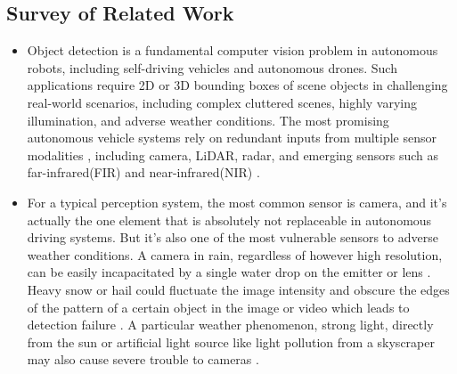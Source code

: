 \documentclass[rnd]{mas_proposal}
\begin{document}
\subsection{Survey of Related Work}
\begin{itemize}




    \item Object detection is a fundamental computer vision problem in autonomous robots, including self-driving vehicles and autonomous drones. Such applications require 2D or 3D bounding boxes of scene objects in challenging real-world scenarios, including complex cluttered scenes, highly varying illumination, and adverse weather conditions. The most promising autonomous vehicle systems rely on redundant inputs from multiple sensor modalities \cite{caesar2020nuscenes} \cite{sun2020scalability} \cite{ziegler2014making}, including camera, LiDAR, radar, and emerging sensors such as far-infrared(FIR) and near-infrared(NIR) \cite{bijelic2020seeing}.

    \item For a typical perception system, the most common sensor is camera, and it's actually the one element that is absolutely not replaceable in autonomous driving systems. But it's also one of the most vulnerable sensors to adverse weather conditions. A camera in rain, regardless of however high resolution, can be easily incapacitated by a single water drop on the emitter or lens \cite{mardirosian2021LiDAR}. Heavy snow or hail could fluctuate the image intensity and obscure the edges of the pattern of a certain object in the image or video which leads to detection failure \cite{zang2019impact}. A particular weather phenomenon, strong light, directly from the sun or artificial light source like light pollution from a skyscraper may also cause severe trouble to cameras \cite{acarballo2020libre}.


\end{itemize}
\end{document}

